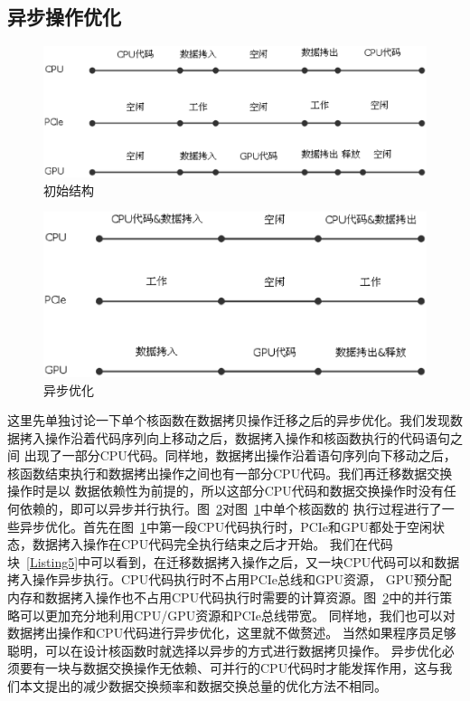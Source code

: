 \subsection{异步操作优化}
\begin{figure}[h]
\centering
\includegraphics[width=1\linewidth]{figure9.eps}
\caption{初始结构}\label{figure9}
\end{figure}
\begin{figure}[h]
\centering
\includegraphics[width=1\linewidth]{figure10.eps}
\caption{异步优化}\label{figure10}
\end{figure}
这里先单独讨论一下单个核函数在数据拷贝操作迁移之后的异步优化。我们发现数据拷入操作沿着代码序列向上移动之后，数据拷入操作和核函数执行的代码语句之间
出现了一部分CPU代码。同样地，数据拷出操作沿着语句序列向下移动之后，核函数结束执行和数据拷出操作之间也有一部分CPU代码。我们再迁移数据交换操作时是以
数据依赖性为前提的，所以这部分CPU代码和数据交换操作时没有任何依赖的，即可以异步并行执行。图~\ref{figure10}对图~\ref{figure9}中单个核函数的
执行过程进行了一些异步优化。首先在图~\ref{figure9}中第一段CPU代码执行时，PCIe和GPU都处于空闲状态，数据拷入操作在CPU代码完全执行结束之后才开始。
我们在代码块~\ref{Listing5}中可以看到，在迁移数据拷入操作之后，又一块CPU代码可以和数据拷入操作异步执行。CPU代码执行时不占用PCIe总线和GPU资源，
GPU预分配内存和数据拷入操作也不占用CPU代码执行时需要的计算资源。图~\ref{figure10}中的并行策略可以更加充分地利用CPU/GPU资源和PCIe总线带宽。
同样地，我们也可以对数据拷出操作和CPU代码进行异步优化，这里就不做赘述。
当然如果程序员足够聪明，可以在设计核函数时就选择以异步的方式进行数据拷贝操作。
异步优化必须要有一块与数据交换操作无依赖、可并行的CPU代码时才能发挥作用，这与我们本文提出的减少数据交换频率和数据交换总量的优化方法不相同。



